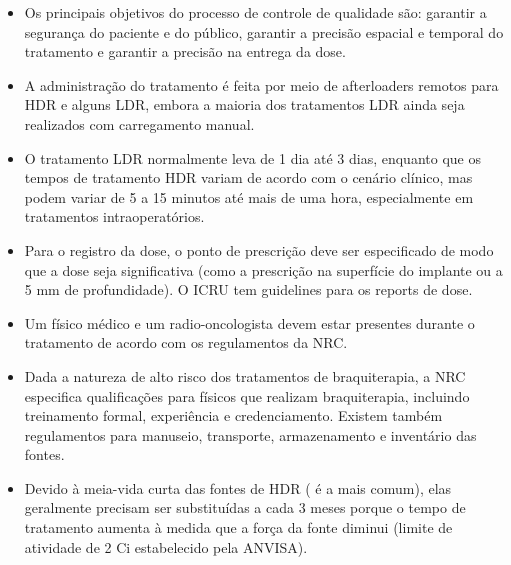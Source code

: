 \documentclass[11pt,a4paper]{article}
\newcounter{exemplo}
\begin{document}
\begin{exemplo}
\begin{itemize}
		\item Os principais objetivos do processo de controle de qualidade são: garantir a segurança do paciente e do público, garantir a precisão espacial e temporal do tratamento e garantir a precisão na entrega da dose. 
		\item A administração do tratamento é feita por meio de afterloaders remotos para HDR e alguns LDR, embora a maioria dos tratamentos LDR ainda seja realizados com carregamento manual.
		\item O tratamento LDR normalmente leva de 1 dia até 3 dias, enquanto que os tempos de tratamento HDR variam de acordo com o cenário clínico, mas podem variar de 5 a 15 minutos até mais de uma hora, especialmente em tratamentos intraoperatórios.
		\item Para o registro da dose, o ponto de prescrição deve ser especificado de modo que a dose seja significativa (como a prescrição na superfície do implante ou a 5 mm de profundidade). O ICRU tem guidelines para os reports de dose.
		\item Um físico médico e um radio-oncologista devem estar presentes durante o tratamento de acordo com os regulamentos da NRC.
		\item Dada a natureza de alto risco dos tratamentos de braquiterapia, a NRC especifica qualificações para físicos que realizam braquiterapia, incluindo treinamento formal, experiência e credenciamento. Existem também regulamentos para manuseio, transporte, armazenamento e inventário das fontes.
		\item Devido à meia-vida curta das fontes de HDR ( é a mais comum), elas geralmente precisam ser substituídas a cada 3 meses porque o tempo de tratamento aumenta à medida que a força da fonte diminui (limite de atividade de 2 Ci estabelecido pela ANVISA).
	\end{itemize}
\end{exemplo}
	

\end{document}
